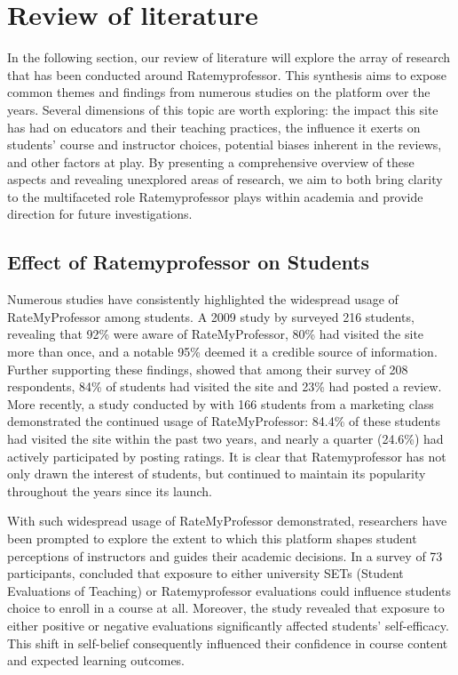 \documentclass[doc,12pt, twocolumn]{apa7}
\begin{document}
\section{Review of literature}
In the following section, our review of literature will explore the array of research that has been conducted around Ratemyprofessor. This synthesis aims to expose common themes and findings from numerous studies on the platform over the years. Several dimensions of this topic are worth exploring: the impact this site has had on educators and their teaching practices, the influence it exerts on students' course and instructor choices, potential biases inherent in the reviews, and other factors at play. By presenting a comprehensive overview of these aspects and revealing unexplored areas of research, we aim to both bring clarity to the multifaceted role Ratemyprofessor plays within academia and provide direction for future investigations.

\subsection{Effect of Ratemyprofessor on Students}
Numerous studies have consistently highlighted the widespread usage of RateMyProfessor among students. A 2009 study by \textcite{davison_how_2009} surveyed 216 students, revealing that 92\% were aware of RateMyProfessor, 80\% had visited the site more than once, and a notable 95\% deemed it a credible source of information. Further supporting these findings, \textcite{bleske-rechek_ratemyprofessors_2010} showed that among their survey of 208 respondents, 84\% of students had visited the site and 23\% had posted a review. More recently, a study conducted by \textcite{chiang_students_2017} with 166 students from a marketing class demonstrated the continued usage of RateMyProfessor: 84.4\% of these students had visited the site within the past two years, and nearly a quarter (24.6\%) had actively participated by posting ratings. It is clear that Ratemyprofessor has not only drawn the interest of students, but continued to maintain its popularity throughout the years since its launch.

With such widespread usage of RateMyProfessor demonstrated, researchers have been prompted to explore the extent to which this platform shapes student perceptions of instructors and guides their academic decisions. In a survey of 73 participants, \textcite{boswell_effects_2020} concluded that exposure to either university SETs (Student Evaluations of Teaching) or Ratemyprofessor evaluations could influence students choice to enroll in a course at all. Moreover, the study revealed that exposure to either positive or negative evaluations significantly affected students' self-efficacy. This shift in self-belief consequently influenced their confidence in course content and expected learning outcomes.








\printbibliography
\end{document}
